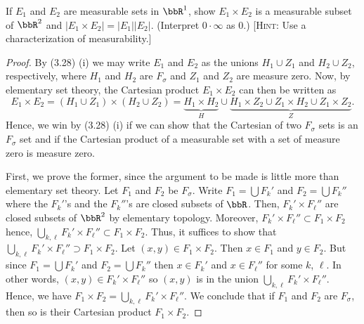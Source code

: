
\begin{problem}
If $E_1$ and $E_2$ are measurable sets in $\bbR^1$, show $E_1\times E_2$ is
a measurable subset of $\bbR^2$ and $\left|E_1\times
  E_2\right|=\left|E_1\right|\left|E_2\right|$. (Interpret $0\cdot\infty$
as $0$.) [\textsc{Hint:} Use a characterization of measurability.]
\end{problem}
\begin{proof}
By (3.28) (i) we may write $E_1$ and $E_2$ as the unions $H_1\cup Z_1$ and
$H_2\cup Z_2$, respectively, where $H_1$ and $H_2$ are $F_\sigma$ and $Z_1$
and $Z_2$ are measure zero. Now, by elementary set theory, the Cartesian
product $E_1\times E_2$ can then be written as
\begin{equation}
\label{eq:1}
E_1\times E_2=(H_1\cup Z_1)\times (H_2\cup Z_2)=
\underbrace{H_1\times H_2}_H\cup
\underbrace{H_1\times Z_2\cup Z_1\times H_2\cup Z_1\times Z_2}_Z.
\end{equation}
Hence, we win by (3.28) (i) if we can show that the Cartesian of two
$F_\sigma$ sets is an $F_\sigma$ set and if the Cartesian product of a
measurable set with a set of measure zero is measure zero.

First, we prove the former, since the argument to be made is little more
than elementary set theory. Let $F_1$ and $F_2$ be $F_\sigma$. Write
$F_1=\bigcup F_k'$ and $F_2=\bigcup F_k''$ where the $F_k'$'s and the
$F_k''$'s are closed subsets of $\bbR$. Then, $F_k'\times F_\ell''$ are
closed subsets of $\bbR^2$ by elementary topology. Moreover,
$F_k'\times F_\ell''\subset F_1\times F_2$ hence,
$\bigcup_{k,\ell} F_k'\times F_\ell''\subset F_1\times F_2$. Thus, it
suffices to show that
$\bigcup_{k,\ell} F_k'\times F_\ell''\supset F_1\times F_2$. Let
$(x,y)\in F_1\times F_2$. Then $x\in F_1$ and $y\in F_2$. But since
$F_1=\bigcup F_k'$ and $F_2=\bigcup F_k''$ then $x\in F_k'$ and
$x\in F_\ell''$ for some $k$, $\ell$. In other words,
$(x,y)\in F_k'\times F_\ell''$ so $(x,y)$ is in the union
$\bigcup_{k,\ell}F_k'\times F_\ell''$. Hence, we have
$F_1\times F_2=\bigcup_{k,\ell} F_k'\times F_\ell''$. We conclude that if
$F_1$ and $F_2$ are $F_\sigma$, then so is their Cartesian product
$F_1\times F_2$.


\end{proof}
